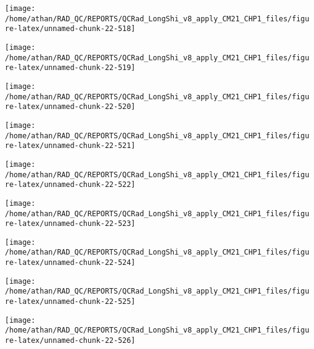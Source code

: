 \documentclass[
  10pt,
  a4paper,oneside]{article}
\begin{document}
\begin{center}\texttt{[image: /home/athan/RAD\_QC/REPORTS/QCRad\_LongShi\_v8\_apply\_CM21\_CHP1\_files/figure-latex/unnamed-chunk-22-518]} \end{center}

\begin{center}\texttt{[image: /home/athan/RAD\_QC/REPORTS/QCRad\_LongShi\_v8\_apply\_CM21\_CHP1\_files/figure-latex/unnamed-chunk-22-519]} \end{center}

\begin{center}\texttt{[image: /home/athan/RAD\_QC/REPORTS/QCRad\_LongShi\_v8\_apply\_CM21\_CHP1\_files/figure-latex/unnamed-chunk-22-520]} \end{center}

\begin{center}\texttt{[image: /home/athan/RAD\_QC/REPORTS/QCRad\_LongShi\_v8\_apply\_CM21\_CHP1\_files/figure-latex/unnamed-chunk-22-521]} \end{center}

\begin{center}\texttt{[image: /home/athan/RAD\_QC/REPORTS/QCRad\_LongShi\_v8\_apply\_CM21\_CHP1\_files/figure-latex/unnamed-chunk-22-522]} \end{center}

\begin{center}\texttt{[image: /home/athan/RAD\_QC/REPORTS/QCRad\_LongShi\_v8\_apply\_CM21\_CHP1\_files/figure-latex/unnamed-chunk-22-523]} \end{center}

\begin{center}\texttt{[image: /home/athan/RAD\_QC/REPORTS/QCRad\_LongShi\_v8\_apply\_CM21\_CHP1\_files/figure-latex/unnamed-chunk-22-524]} \end{center}

\begin{center}\texttt{[image: /home/athan/RAD\_QC/REPORTS/QCRad\_LongShi\_v8\_apply\_CM21\_CHP1\_files/figure-latex/unnamed-chunk-22-525]} \end{center}

\begin{center}\texttt{[image: /home/athan/RAD\_QC/REPORTS/QCRad\_LongShi\_v8\_apply\_CM21\_CHP1\_files/figure-latex/unnamed-chunk-22-526]} \end{center}
\end{document}
